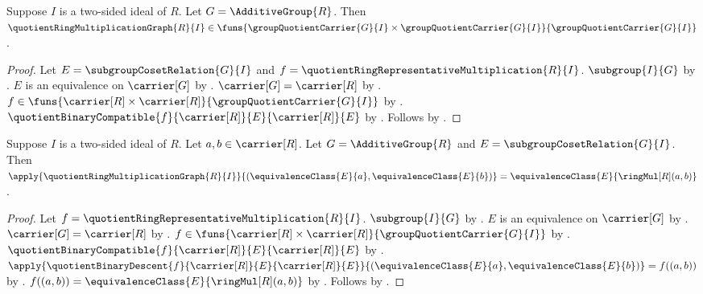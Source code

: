 \begin{proposition}\label{quotient_ring_multiplication_graph_type}
    Suppose $I$ is a two-sided ideal of $R$.
    Let $G=\AdditiveGroup{R}$.
    Then $\quotientRingMultiplicationGraph{R}{I}\in
        \funs{
            \groupQuotientCarrier{G}{I}\times
            \groupQuotientCarrier{G}{I}}
            {\groupQuotientCarrier{G}{I}}$.
\end{proposition}
\begin{proof}
    Let $E=\subgroupCosetRelation{G}{I}$ and
        $f=\quotientRingRepresentativeMultiplication{R}{I}$.
    $\subgroup{I}{G}$ by
        .
    $E$ is an equivalence on $\carrier[G]$ by
        .
    $\carrier[G]=\carrier[R]$ by .
    $f\in\funs{\carrier[R]\times\carrier[R]}{
        \groupQuotientCarrier{G}{I}}$ by
        .
    $\quotientBinaryCompatible{f}{\carrier[R]}{E}{\carrier[R]}{E}$ by
        .
    Follows by
        .
\end{proof}

\begin{proposition}\label{quotient_ring_multiplication_graph_apply}
    Suppose $I$ is a two-sided ideal of $R$.
    Let $a,b\in\carrier[R]$.
    Let $G=\AdditiveGroup{R}$ and $E=\subgroupCosetRelation{G}{I}$.
    Then
        $\apply{\quotientRingMultiplicationGraph{R}{I}}{
            (\equivalenceClass{E}{a},\equivalenceClass{E}{b})}
        =\equivalenceClass{E}{\ringMul[R](a,b)}$.
\end{proposition}
\begin{proof}
    Let $f=\quotientRingRepresentativeMultiplication{R}{I}$.
    $\subgroup{I}{G}$ by
        .
    $E$ is an equivalence on $\carrier[G]$ by
        .
    $\carrier[G]=\carrier[R]$ by .
    $f\in\funs{\carrier[R]\times\carrier[R]}{
        \groupQuotientCarrier{G}{I}}$ by
        .
    $\quotientBinaryCompatible{f}{\carrier[R]}{E}{\carrier[R]}{E}$ by
        .
    $\apply{\quotientBinaryDescent{f}{\carrier[R]}{E}{\carrier[R]}{E}}{
        (\equivalenceClass{E}{a},\equivalenceClass{E}{b})}
        =f((a,b))$ by .
    $f((a,b))=\equivalenceClass{E}{\ringMul[R](a,b)}$ by
        .
    Follows by .
\end{proof}

